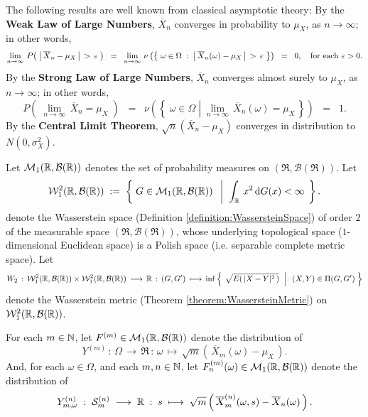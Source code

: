 \begin{remark}\quad
The following results are well known from classical asymptotic theory:
\vskip 0.1cm
\noindent
By the \textbf{Weak Law of Large Numbers}, $\overline{X}_{n}$ converges in probability to $\mu_{X}$,
as $n \longrightarrow \infty$; in other words,
\begin{equation*}
\lim_{n\rightarrow\infty}\,P\!\left(\;\left\vert\,\overline{X}_{n} - \mu_{X}\,\right\vert \,>\, \varepsilon\;\right)
\;\;=\;\;
\lim_{n\rightarrow\infty}\,\nu\left(\left\{\;\omega\in\Omega\;:\;\left\vert\,\overline{X}_{n}(\omega) - \mu_{X}\,\right\vert \,>\, \varepsilon\;\right\}\right)
\;\;=\;\; 0,
\quad\textnormal{for each $\varepsilon > 0$}.
\end{equation*}
By the \textbf{Strong Law of Large Numbers}, $\overline{X}_{n}$ converges almost surely to $\mu_{X}$,
as $n \longrightarrow \infty$; in other words,
\begin{equation*}
P\!\left(\;\lim_{n\rightarrow\infty}\,\overline{X}_{n} = \mu_{X}\;\right)
\;\;=\;\;
\nu\left(\left\{\;\omega\in\Omega \;\left\vert\; \lim_{n\rightarrow\infty}\,\overline{X}_{n}(\omega) = \mu_{X} \right. \,\right\}\right)
\;\;=\;\; 1.
\end{equation*}
By the \textbf{Central Limit Theorem}, $\sqrt{n}\left(\overline{X}_{n} - \mu_{X}\right)$ converges in distribution to $N(0,\sigma^{2}_{X})$.
\end{remark}

\proof
Let $\mathcal{M}_{1}(\mathbb{R},\mathcal{B}(\mathbb{R}))$ denotes the set of probability measures on $(\Re,\mathcal{B}(\Re))$.
Let
\begin{equation*}
\mathcal{W}^{2}_{1}\!\left(\mathbb{R},\mathcal{B}(\mathbb{R})\right)
\; := \;
\left\{\;
G \in \mathcal{M}_{1}(\mathbb{R},\mathcal{B}(\mathbb{R}))
\;\;\left\vert\;\;
\int_{\mathbb{R}}\,x^{2}\,\textnormal{d} G(x) < \infty
\right.
\;\right\}.
\end{equation*}
denote the Wasserstein space (Definition \ref{definition:WassersteinSpace}) of order $2$
of the measurable space $\left(\Re,\mathcal{B}(\Re)\right)$, whose underlying topological
space ($1$-dimensional Euclidean space) is a Polish space (i.e. separable complete metric space).
Let
\begin{equation*}
W_{2}
\,:\, \mathcal{W}^{2}_{1}\!\left(\mathbb{R},\mathcal{B}(\mathbb{R})\right) \times \mathcal{W}^{2}_{1}\!\left(\mathbb{R},\mathcal{B}(\mathbb{R})\right) \, \longrightarrow \, \mathbb{R}
\,:\, (G,G^{\prime}) \, \longmapsto \,
\inf\left\{\;
\left.
\sqrt{E\!\left(\,\vert X - Y \vert^{2}\,\right)}
\;\;\right\vert\;\;
(X,Y)\in \Pi(G,G^{\prime})
\;\right\}
\end{equation*}
denote the Wasserstein metric (Theorem \ref{theorem:WassersteinMetric}) on $\mathcal{W}^{2}_{1}\!\left(\mathbb{R},\mathcal{B}(\mathbb{R})\right)$.

\vskip 0.5cm
\noindent
For each $m \in \mathbb{N}$, let $F^{(m)} \in \mathcal{M}_{1}(\mathbb{R},\mathcal{B}(\mathbb{R}))$ denote the distribution of
\begin{equation*}
Y^{(m)}
\,:\, \Omega \,\longrightarrow\, \Re
\,:\, \omega \,\longmapsto\, \sqrt{m}\left(\,\overline{X}_{m}(\omega) - \mu_{X}\,\right).
\end{equation*}
And, for each $\omega \in \Omega$, and each $m, n \in \mathbb{N}$, let $F^{(m)}_{n}(\omega) \in \mathcal{M}_{1}(\mathbb{R},\mathcal{B}(\mathbb{R}))$ denote the distribution of
\begin{equation*}
Y^{(n)}_{m,\omega}
\;:\;
\mathcal{S}^{(n)}_{m}\;\longrightarrow\; \mathbb{R}
\;:\;
s
\;\longmapsto\;
\sqrt{m}\left(\,\overline{X}^{(n)}_{m}(\omega,s) - \overline{X}_{n}(\omega)\,\right).
\end{equation*}

